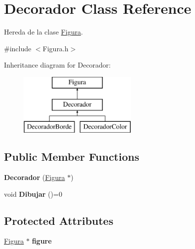 \hypertarget{class_decorador}{\section{Decorador Class Reference}
\label{class_decorador}
}


Hereda de la clase \hyperlink{class_figura}{Figura}.  




{\ttfamily \#include $<$Figura.\-h$>$}

Inheritance diagram for Decorador\-:\begin{figure}[H]
\begin{center}
\leavevmode
\includegraphics[height=3.000000cm]{class_decorador}
\end{center}
\end{figure}
\subsection*{Public Member Functions}
\begin{DoxyCompactItemize}
\item 
\hypertarget{class_decorador_a76e3dfcc36f2d26129c779ac98d8cbf9}{{\bfseries Decorador} (\hyperlink{class_figura}{Figura} $\ast$)}\label{class_decorador_a76e3dfcc36f2d26129c779ac98d8cbf9}

\item 
\hypertarget{class_decorador_ab6c8afe92d17635382c773f2c6fb1412}{void {\bfseries Dibujar} ()=0}\label{class_decorador_ab6c8afe92d17635382c773f2c6fb1412}

\end{DoxyCompactItemize}
\subsection*{Protected Attributes}
\begin{DoxyCompactItemize}
\item 
\hypertarget{class_decorador_aea8ca6d426bd8833b4e43bd95e667efe}{\hyperlink{class_figura}{Figura} $\ast$ {\bfseries figure}}\label{class_decorador_aea8ca6d426bd8833b4e43bd95e667efe}

\end{DoxyCompactItemize}


